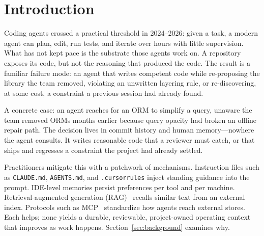 \documentclass[sigconf,nonacm]{acmart}
\begin{document}
\maketitle

\section{Introduction}
Coding agents crossed a practical threshold in 2024--2026: given a task, a modern agent can plan, edit, run tests, and iterate over hours with little supervision. What has not kept pace is the substrate those agents work on. A repository exposes its code, but not the reasoning that produced the code. The result is a familiar failure mode: an agent that writes competent code while re-proposing the library the team removed, violating an unwritten layering rule, or re-discovering, at some cost, a constraint a previous session had already found.

A concrete case: an agent reaches for an ORM to simplify a query, unaware the team removed ORMs months earlier because query opacity had broken an offline repair path. The decision lives in commit history and human memory---nowhere the agent consults. It writes reasonable code that a reviewer must catch, or that ships and regresses a constraint the project had already settled.

Practitioners mitigate this with a patchwork of mechanisms. Instruction files such as \texttt{CLAUDE.md}, \texttt{AGENTS.md}, and \texttt{.cursorrules} inject standing guidance into the prompt. IDE-level memories persist preferences per tool and per machine. Retrieval-augmented generation (RAG)~\cite{lewis2020rag} recalls similar text from an external index. Protocols such as MCP~\cite{mcp2024} standardize how agents reach external stores. Each helps; none yields a durable, reviewable, project-owned operating context that improves as work happens. Section~\ref{sec:background} examines why.
\end{document}
